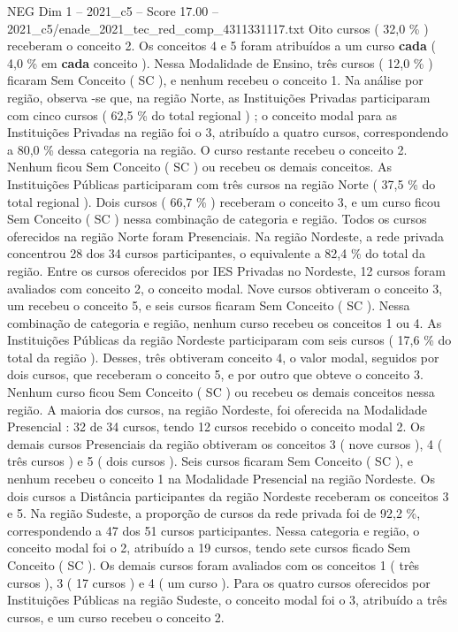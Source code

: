 \begin{textsample}{NEG Dim 1 – 2021\_c5 – Score 17.00 – 2021\_c5/enade\_2021\_tec\_red\_comp\_4311331117.txt}
Oito cursos ( 32,0 \% ) receberam o conceito 2.
Os conceitos 4 e 5 foram atribuídos a um curso \textbf{cada} ( 4,0 \% em \textbf{cada} conceito ).
Nessa Modalidade de Ensino, três cursos ( 12,0 \% ) ficaram Sem Conceito ( SC ), e nenhum recebeu o conceito 1.
Na análise por região, observa -se que, na região Norte, as Instituições Privadas participaram com cinco cursos ( 62,5 \% do total regional ) ; o conceito modal para as Instituições Privadas na região foi o 3, atribuído a quatro cursos, correspondendo a 80,0 \% dessa categoria na região.
O curso restante recebeu o conceito 2.
Nenhum ficou Sem Conceito ( SC ) ou recebeu os demais conceitos.
As Instituições Públicas participaram com três cursos na região Norte ( 37,5 \% do total regional ).
Dois cursos ( 66,7 \% ) receberam o conceito 3, e um curso ficou Sem Conceito ( SC ) nessa combinação de categoria e região.
Todos os cursos oferecidos na região Norte foram Presenciais.
Na região Nordeste, a rede privada concentrou 28 dos 34 cursos participantes, o equivalente a 82,4 \% do total da região.
Entre os cursos oferecidos por IES Privadas no Nordeste, 12 cursos foram avaliados com conceito 2, o conceito modal.
Nove cursos obtiveram o conceito 3, um recebeu o conceito 5, e seis cursos ficaram Sem Conceito ( SC ).
Nessa combinação de categoria e região, nenhum curso recebeu os conceitos 1 ou 4.
As Instituições Públicas da região Nordeste participaram com seis cursos ( 17,6 \% do total da região ).
Desses, três obtiveram conceito 4, o valor modal, seguidos por dois cursos, que receberam o conceito 5, e por outro que obteve o conceito 3.
Nenhum curso ficou Sem Conceito ( SC ) ou recebeu os demais conceitos nessa região.
A maioria dos cursos, na região Nordeste, foi oferecida na Modalidade Presencial : 32 de 34 cursos, tendo 12 cursos recebido o conceito modal 2.
Os demais cursos Presenciais da região obtiveram os conceitos 3 ( nove cursos ), 4 ( três cursos ) e 5 ( dois cursos ).
Seis cursos ficaram Sem Conceito ( SC ), e nenhum recebeu o conceito 1 na Modalidade Presencial na região Nordeste.
Os dois cursos a Distância participantes da região Nordeste receberam os conceitos 3 e 5.
Na região Sudeste, a proporção de cursos da rede privada foi de 92,2 \%, correspondendo a 47 dos 51 cursos participantes.
Nessa categoria e região, o conceito modal foi o 2, atribuído a 19 cursos, tendo sete cursos ficado Sem Conceito ( SC ).
Os demais cursos foram avaliados com os conceitos 1 ( três cursos ), 3 ( 17 cursos ) e 4 ( um curso ).
Para os quatro cursos oferecidos por Instituições Públicas na região Sudeste, o conceito modal foi o 3, atribuído a três cursos, e um curso recebeu o conceito 2.

\end{textsample}
